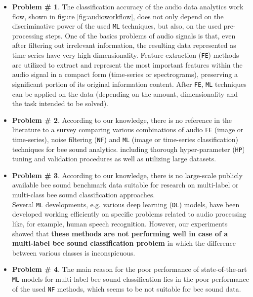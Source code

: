 \documentclass[12pt]{report}
\begin{document}
	\begin{itemize}
		\item \textbf{Problem \# 1}. The classification accuracy of the audio data analytics work flow, shown in figure \ref{fig:audioworkflow}, does not only depend on the discriminative power of the used {\tt ML} techniques, but also, on the used pre-processing steps. One of the basics problems of audio signals is that, even after filtering out irrelevant information, the resulting data represented as time-series have very high dimensionality. Feature extraction ({\tt FE}) methods are utilized to extract and represent the most important features within the audio signal in a compact form (time-series or spectrograms), preserving a significant portion of its original information content. After {\tt FE}, {\tt ML} techniques can be applied on the data (depending on the amount, dimensionality and the task intended to be solved).
		
		\item \textbf{Problem \# 2}. According to our knowledge, there is no reference in the literature to a survey comparing various combinations of audio {\tt FE} (image or time-series), noise filtering ({\tt NF}) and {\tt ML} (image or time-series classification) techniques for bee sound analytics. including thorough hyper-parameter ({\tt HP}) tuning and validation procedures as well as utilizing large datasets.
		
		\item \textbf{Problem \# 3}. According to our knowledge, there is no large-scale publicly available bee sound benchmark data suitable for research on multi-label or multi-class bee sound classification approaches.\\
		Several {\tt ML} developments, e.g. various deep learning ({\tt DL}) models, have been developed working efficiently on specific problems related to audio processing like, for example, human speech recognition. However, our experiments showed that \textbf{these methods are not performing well in case of a multi-label bee sound classification problem} in which the difference between various classes is inconspicuous.
		
		\item \textbf{Problem \# 4}. The main reason for the poor performance of state-of-the-art {\tt ML} models for multi-label bee sound classification lies in the poor performance of the used {\tt NF} methods, which seems to be not suitable for bee sound data.
	\end{itemize}
	
\end{document}
